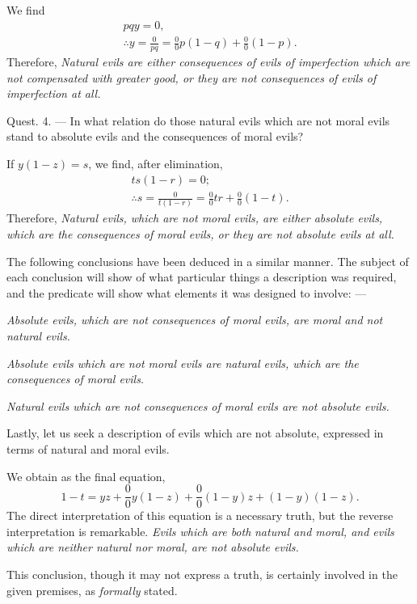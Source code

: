 \documentclass[oneside]{book}
\begin{document}
We find
\begin{gather*}
  pqy = 0,  \\
  \therefore y = \frac{0}{pq} = \frac{0}{0}p(1-q) + \frac{0}{0}(1-p).
\end{gather*}
Therefore, \emph{Natural evils are either consequences of evils of imperfection which are not compensated with greater good, or they are not
consequences of evils of imperfection at all.}

Quest. 4. --- In what relation do those natural evils which are
not moral evils stand to absolute evils and the consequences of
moral evils?

If $y(1-z) = s$, we find, after elimination,
\begin{gather*}
  ts(1-r) = 0;   \\
 \therefore s = \frac{0}{t(1-r)} = \frac{0}{0}tr + \frac{0}{0}(1-t).
\end{gather*}
Therefore, \emph{Natural evils, which are not moral evils, are either absolute evils, which are the consequences of moral evils, or they are not
absolute evils at all.}

The following conclusions have been deduced in a similar
manner. The subject of each conclusion will show of what particular things a description was required, and the predicate will
show what elements it was designed to involve: ---

\emph{Absolute evils, which are not consequences of moral evils, are
moral and not natural evils.}

\emph{Absolute evils which are not moral evils are natural evils, which
are the consequences of moral evils.}

\emph{Natural evils which are not consequences of moral evils are not
absolute evils.}

Lastly, let us seek a description of evils which are not absolute, expressed in terms of natural and moral evils.

We obtain as the final equation,
\[
  1 - t = yz + \frac{0}{0}y(1-z) + \frac{0}{0}(1-y)z + (1-y)(1-z).
\]
The direct interpretation of this equation is a necessary truth,
but the reverse interpretation is remarkable. \emph{Evils which are both}
\emph{natural and moral, and evils which are neither natural nor moral,
are not absolute evils.}

This conclusion, though it may not express a truth, is certainly involved in the given premises, as \emph{formally} stated.
\end{document}
